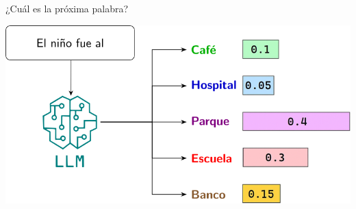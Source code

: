 \begin{frame}{¿Cuál es la próxima palabra?}

\begin{center}
    \includegraphics[width=0.8\linewidth]{Figuras/Fig03.png} 
\end{center}
\end{frame}



